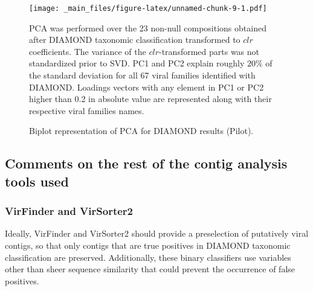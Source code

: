 \documentclass[
  openany]{book}
\begin{document}
\begin{figure}[!htbp]

\texttt{[image: \_main\_files/figure-latex/unnamed-chunk-9-1.pdf]}

\caption{Biplot representation of PCA for DIAMOND results (Pilot).\label{fig:sample50pcadiamond}}
PCA was performed over the 23 non-null compositions obtained after DIAMOND taxonomic classification transformed to $clr$ coefficients. The variance of the $clr$-transformed parts was not standardized prior to SVD. PC1 and PC2 explain roughly $20\%$ of the standard deviation for all 67 viral families identified with DIAMOND. Loadings vectors with any element in PC1 or PC2 higher than 0.2 in absolute value are represented along with their respective viral families names. 

\end{figure}

\hypertarget{comments-on-the-rest-of-the-contig-analysis-tools-used}{%
\subsection{Comments on the rest of the contig analysis tools used}\label{comments-on-the-rest-of-the-contig-analysis-tools-used}}

\hypertarget{virfinder-and-virsorter2}{%
\subsubsection{VirFinder and VirSorter2}\label{virfinder-and-virsorter2}}

Ideally, VirFinder and VirSorter2 should provide a preselection of putatively viral contigs, so that only contigs that are true positives in DIAMOND taxonomic classification are preserved. Additionally, these binary classifiers use variables other than sheer sequence similarity that could prevent the occurrence of false positives.
\end{document}
